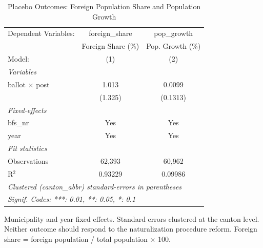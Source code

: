 
\begin{table}[htbp]
   \caption{\label{tab:placebo} Placebo Outcomes: Foreign Population Share and Population Growth}
   \centering
   \begin{tabular}{lcc}
      \tabularnewline \midrule \midrule
      Dependent Variables:  & foreign\_share      & pop\_growth\\   
                            & Foreign Share (\%)  & Pop. Growth (\%) \\    
      Model:                & (1)                 & (2)\\  
      \midrule
      \emph{Variables}\\
      ballot $\times$ post  & 1.013               & 0.0099\\   
                            & (1.325)             & (0.1313)\\   
      \midrule
      \emph{Fixed-effects}\\
      bfs\_nr               & Yes                 & Yes\\  
      year                  & Yes                 & Yes\\  
      \midrule
      \emph{Fit statistics}\\
      Observations          & 62,393              & 60,962\\  
      R$^2$                 & 0.93229             & 0.09986\\  
      \midrule \midrule
      \multicolumn{3}{l}{\emph{Clustered (canton\_abbr) standard-errors in parentheses}}\\
      \multicolumn{3}{l}{\emph{Signif. Codes: ***: 0.01, **: 0.05, *: 0.1}}\\
   \end{tabular}
   
   \par \raggedright 
   Municipality and year fixed effects. Standard errors clustered at the canton level. Neither outcome should respond to the naturalization procedure reform. Foreign share = foreign population / total population $\times$ 100.
\end{table}


